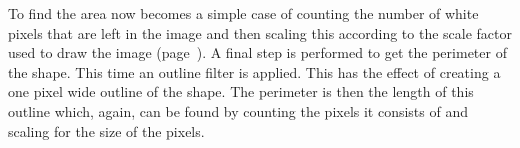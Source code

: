 To find the area now becomes a simple case of counting the number of white
pixels that are left in the image and then scaling this according to the scale
factor used to draw the image (page~\pageref{it:scale}). A final step is
performed to get the perimeter of the shape. This time an outline filter is
applied. This has the effect of creating a one pixel wide outline of the shape.
The perimeter is then the length of this outline which, again, can be found by
counting the pixels it consists of and scaling for the size of the pixels.

